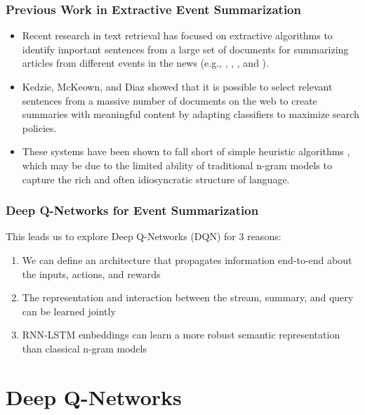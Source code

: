 \documentclass[]{beamer}
\begin{document}
\begin{frame}
	\frametitle{Previous Work in Extractive Event Summarization} 
	\begin{itemize}
		\item<1-> Recent research in text retrieval  has focused on extractive algorithms to identify important sentences from a large set of documents for summarizing articles from different events in the news (e.g., \cite{diazquery}, \cite{kedzie2015predicting}, \cite{garbacea2015university}, and \cite{kedzieextractive}).
		\item<1-> Kedzie, McKeown, and Diaz \cite{kedzie2015predicting} showed that it is possible to select relevant sentences from a massive number of documents on the web to create summaries with meaningful content by adapting classifiers to maximize search policies.
		\item<1-> These systems have been shown to  fall short of simple heuristic algorithms \cite{garbacea2015university}, which may be due to the limited ability of traditional n-gram models to capture the rich and often idiosyncratic structure of language.
	\end{itemize}

\end{frame}

\begin{frame}
	\frametitle{Deep Q-Networks for Event Summarization} 
This leads us to explore Deep Q-Networks (DQN) for 3 reasons: 
	 \vspace{-0.2cm} \begin{enumerate}
	\item <1-> We can define an architecture that propagates information end-to-end about the inputs, actions, and rewards 
	\item <1-> The representation and interaction between the stream, summary, and query can be learned jointly
	\item <1 -> RNN-LSTM embeddings can learn a more robust semantic representation than classical n-gram models
	\end{enumerate}
\end{frame}


\section{Deep Q-Networks}
\end{document}
